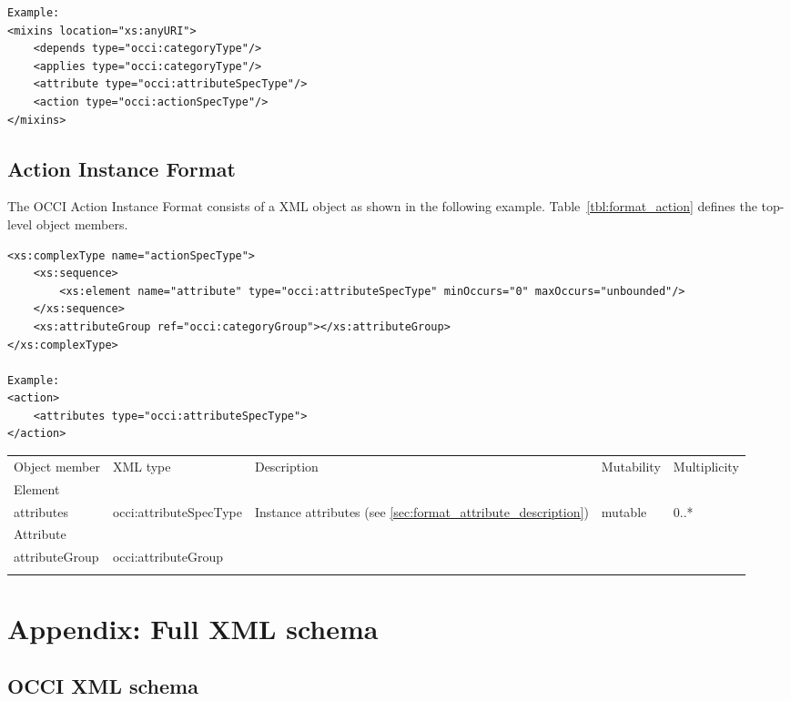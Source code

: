 \documentclass[10pt,a4paper]{article}
\begin{document}
\begin{lstlisting}
Example:
<mixins location="xs:anyURI">
	<depends type="occi:categoryType"/>
	<applies type="occi:categoryType"/>
	<attribute type="occi:attributeSpecType"/>
	<action type="occi:actionSpecType"/>
</mixins>
\end{lstlisting}

\subsection{Action Instance Format}
\label{sec:format_action}

The OCCI Action Instance Format consists of a XML object as shown in the
following example.
Table~\ref{tbl:format_action} defines the top-level object members.
\begin{lstlisting}
<xs:complexType name="actionSpecType">
	<xs:sequence>
		<xs:element name="attribute" type="occi:attributeSpecType" minOccurs="0" maxOccurs="unbounded"/>
	</xs:sequence>
	<xs:attributeGroup ref="occi:categoryGroup"></xs:attributeGroup>
</xs:complexType>

Example:
<action>
	<attributes type="occi:attributeSpecType">
</action>
\end{lstlisting}

 {
    \begin{tabularx}{\textwidth}{llXll}
    \toprule
    Object member & XML type & Description & Mutability & Multiplicity \\
    \colrule
    Element\\
    attributes & occi:attributeSpecType & Instance attributes (see
\ref{sec:format_attribute_description}) & mutable & 0..* \\
 
    Attribute\\
    attributeGroup & occi:attributeGroup & & & \\
    \botrule
    \end{tabularx}
}

\section{Appendix: Full XML schema}
\label{sec:full_xml_schema}

\subsection{OCCI XML schema}
\label{sec:occi_xml_schema}
\end{document}
